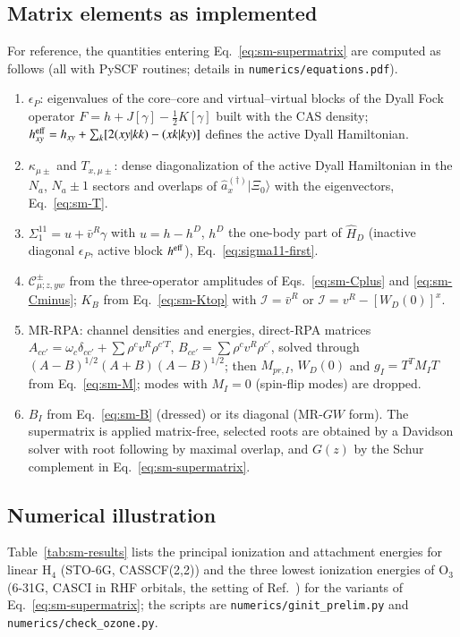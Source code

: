 \documentclass[aip,jcp,reprint,noshowkeys,superscriptaddress]{revtex4-1}
\begin{document}
\subsection{Matrix elements as implemented}

For reference, the quantities entering Eq.~\eqref{eq:sm-supermatrix} are
computed as follows (all with PySCF routines; details in
\texttt{numerics/equations.pdf}).
\begin{enumerate}
\item $\epsilon_P$: eigenvalues of the core--core and virtual--virtual
  blocks of the Dyall Fock operator $F=h+J[\gamma]-\tfrac12K[\gamma]$ built
  with the CAS density; $h^{\rm eff}_{xy}=h_{xy}+\sum_k[2(xy|kk)-(xk|ky)]$
  defines the active Dyall Hamiltonian.
\item $\kappa_{\mu\pm}$ and $T_{x,\mu\pm}$: dense diagonalization of the
  active Dyall Hamiltonian in the $N_a$, $N_a\pm1$ sectors and overlaps of
  $\hat a_x^{(\dagger)}|\Xi_0\rangle$ with the eigenvectors,
  Eq.~\eqref{eq:sm-T}.
\item $\Sigma^{11}_1=u+\bar v^R\gamma$ with $u=h-h^{D}$, $h^{D}$ the
  one-body part of $\hat H_D$ (inactive diagonal $\epsilon_P$, active block
  $h^{\rm eff}$), Eq.~\eqref{eq:sigma11-first}.
\item $\mathcal C^{\pm}_{\mu;z,yw}$ from the three-operator amplitudes of
  Eqs.~\eqref{eq:sm-Cplus} and \eqref{eq:sm-Cminus}; $K_B$ from
  Eq.~\eqref{eq:sm-Ktop} with $\mathcal I=\bar v^R$ or
  $\mathcal I=v^R-[W_D(0)]^{x}$.
\item MR-RPA: channel densities and energies, direct-RPA matrices
  $A_{cc'}=\omega_c\delta_{cc'}+\sum\rho^{c}v^R\rho^{c'T}$,
  $B_{cc'}=\sum\rho^{c}v^R\rho^{c'}$, solved through
  $(A-B)^{1/2}(A+B)(A-B)^{1/2}$; then $M_{pr,I}$, $W_D(0)$ and
  $g_I=T^{T}M_IT$ from Eq.~\eqref{eq:sm-M}; modes with $M_I=0$ (spin-flip
  modes) are dropped.
\item $B_I$ from Eq.~\eqref{eq:sm-B} (dressed) or its diagonal (MR-$GW$
  form).  The supermatrix is applied matrix-free, selected roots are
  obtained by a Davidson solver with root following by maximal overlap, and
  $G(z)$ by the Schur complement in Eq.~\eqref{eq:sm-supermatrix}.
\end{enumerate}

\subsection{Numerical illustration}

Table~\ref{tab:sm-results} lists the principal ionization and attachment
energies for linear H$_4$ (STO-6G, CASSCF(2,2)) and the three lowest
ionization energies of O$_3$ (6-31G, CASCI in RHF orbitals, the setting of
Ref.~\cite{WangFangLi2026}) for the variants of
Eq.~\eqref{eq:sm-supermatrix}; the scripts are \texttt{numerics/ginit\_prelim.py}
and \texttt{numerics/check\_ozone.py}.
\end{document}
